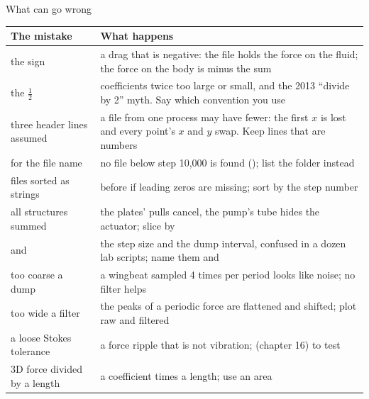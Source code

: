 \documentclass[aspectratio=169,11pt]{beamer}
\begin{document}
\begin{frame}{What can go wrong}
\label{fr:wrong}
\scriptsize
\begin{tabular}{@{}L{0.3\textwidth}L{0.62\textwidth}@{}}
\toprule
The mistake & What happens\\
\midrule
the sign & a drag that is negative: the file holds the force on the fluid; the force on the body is minus the sum\\
the $\frac12$ & coefficients twice too large or small, and the 2013 ``divide by 2'' myth. Say which convention you use\\
three header lines assumed & a file from one process may have fewer: the first $x$ is lost and every point's $x$ and $y$ swap. Keep lines that are numbers\\
 for the file name & no file below step 10,000 is found (); list the folder instead\\
files sorted as strings &  before  if leading zeros are missing; sort by the step number\\
all structures summed & the plates' pulls cancel, the pump's tube hides the actuator; slice by \\
 and  & the step size and the dump interval, confused in a dozen lab scripts; name them  and \\
too coarse a dump & a wingbeat sampled 4 times per period looks like noise; no filter helps\\
too wide a filter & the peaks of a periodic force are flattened and shifted; plot raw and filtered\\
a loose Stokes tolerance & a force ripple that is not vibration;  (chapter 16) to test\\
3D force divided by a length & a coefficient times a length; use an area\\
\bottomrule
\end{tabular}
\end{frame}
\end{document}
